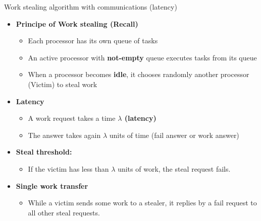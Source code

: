 \documentclass{beamer}
\begin{document}
\begin{frame}{Work stealing algorithm with communications (latency)}
    \begin{itemize}
        \item \textbf{Principe of Work stealing (Recall)} 
            \begin{itemize}
                \item Each processor has its own queue of tasks
                \item An active processor with \textbf{not-empty} queue executes tasks from its queue
                \item When a processor becomes \textbf{idle}, it chooses randomly another processor (Victim) to steal work
            \end{itemize}
                
        \item \textbf{Latency }   
            \begin{itemize}
                \item A work request takes a time \textbf{$\lambda$ (latency)}
                \item The answer takes again $\lambda$ units of time (fail answer or work answer)
            \end{itemize}
        \item \textbf{Steal threshold:}
            \begin{itemize}
                \item If the victim has less than $\lambda$ units of work, the steal request fails.
            \end{itemize}
            
        \item \textbf{Single work transfer}
            \begin{itemize}
                \item While a victim sends some work to a stealer, it replies by a fail request to all other steal requests. 
            \end{itemize}
    \end{itemize}
\end{frame}
\end{document}
